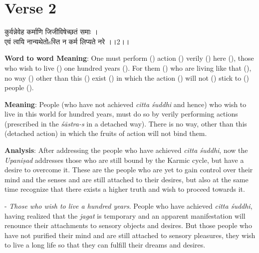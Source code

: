 \chapter{Verse 2}

\begin{moolashloka}
कुर्वन्नेवेह कर्माणि जिजीविषेच्छतं समाः ।\\
एवं त्वयि नान्यथेतोsस्ति न कर्म लिप्यते नरे ।।2।।
\end{moolashloka}

\textbf{Word to word Meaning}: One must perform () action () verily () here (), those who wish to live () one hundred years (). For them () who are living like that (), no way () other than this () exist () in which the action () will not () stick to () people ().

\textbf{Meaning}: People (who have not achieved \emph{citta śuddhi} and hence) who wish to live in this world for hundred years, must do so by verily performing actions (prescribed in the \emph{śāstra-s} in a detached way). There is no way, other than this (detached action) in which the fruits of action will not bind them.

\textbf{Analysis}: After addressing the people who have achieved \emph{citta śuddhi}, now the \emph{Upaniṣad} addresses those who are still bound by the Karmic cycle, but have a desire to overcome it. These are the people who are yet to gain control over their mind and the senses and are still attached to their desires, but also at the same time recognize that there exists a higher truth and wish to proceed towards it.

- \emph{Those who wish to live a hundred years}. People who have achieved \emph{citta śuddhi}, having realized that the \emph{jagat} is temporary and an apparent manifestation will renounce their attachments to sensory objects and desires. But those people who have not purified their mind and are still attached to sensory pleasures, they wish to live a long life so that they can fulfill their dreams and desires.

